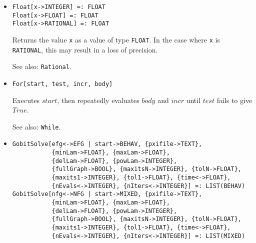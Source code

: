 \begin{itemize}

\item
\protect \large \begin{verbatim}
Float[x->INTEGER] =: FLOAT
Float[x->FLOAT] =: FLOAT
Float[x->RATIONAL] =: FLOAT
\end{verbatim} \normalsize

\bd
Returns the value \verb+x+ as a value of type {\tt FLOAT}.
In the case where \verb+x+ is {\tt RATIONAL}, this may result in a loss
of precision.
\item
[See also:] {\tt Rational}.
\ed

\item
\protect \large \begin{verbatim}
For[start, test, incr, body]
\end{verbatim}\normalsize

\bd
Executes $start$, then repeatedly evaluates $body$ and $incr$
until $test$ fails to give $True$.
\item
[See also:] \verb+While+.
\ed


\item
\protect \large \begin{verbatim}
GobitSolve[efg<->EFG | start->BEHAV, {pxifile->TEXT},
           {minLam->FLOAT}, {maxLam->FLOAT},
           {delLam->FLOAT}, {powLam->INTEGER},
           {fullGraph->BOOL}, {maxitsN->INTEGER}, {tolN->FLOAT},
           {maxits1->INTEGER}, {tol1->FLOAT}, {time<->FLOAT},
           {nEvals<->INTEGER}, {nIters<->INTEGER}] =: LIST(BEHAV)
GobitSolve[nfg<->NFG | start->MIXED, {pxifile->TEXT},
           {minLam->FLOAT}, {maxLam->FLOAT},
           {delLam->FLOAT}, {powLam->INTEGER},
           {fullGraph->BOOL}, {maxitsN->INTEGER}, {tolN->FLOAT},
           {maxits1->INTEGER}, {tol1->FLOAT}, {time<->FLOAT},
           {nEvals<->INTEGER}, {nIters<->INTEGER}] =: LIST(MIXED)
\end{verbatim}\normalsize


\end{itemize}
